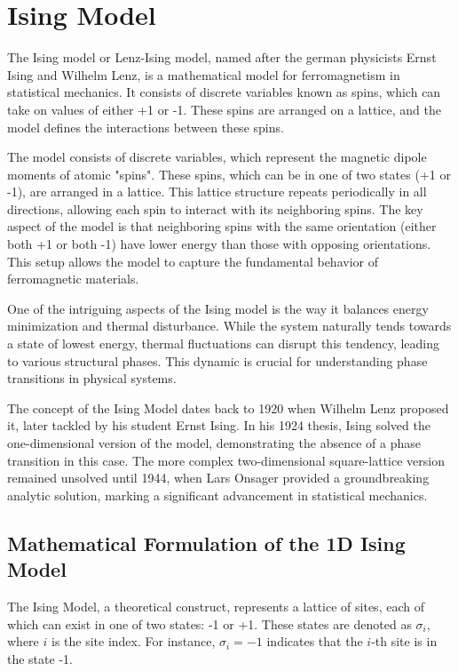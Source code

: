 \section{Ising Model}
\label{sec:ising}

The Ising model or  Lenz-Ising model, named after the german physicists Ernst
Ising and  Wilhelm Lenz, is a mathematical model for ferromagnetism in
statistical mechanics. It consists of discrete variables known as spins, which
can take on values of either +1 or -1. These spins are arranged on a lattice,
and the model defines the interactions between these spins.

The model consists of discrete variables, which represent the magnetic dipole
moments of atomic "spins". These spins, which can be in one of two states (+1 or
-1), are arranged in a lattice. This lattice structure repeats periodically in
all directions, allowing each spin to interact with its neighboring spins. The
key aspect of the model is that neighboring spins with the same orientation
(either both +1 or both -1) have lower energy than those with opposing
orientations. This setup allows the model to capture the fundamental behavior of
ferromagnetic materials.

One of the intriguing aspects of the Ising model is the way it balances energy
minimization and thermal disturbance. While the system naturally tends towards a
state of lowest energy, thermal fluctuations can disrupt this tendency, leading
to various structural phases. This dynamic is crucial for understanding phase
transitions in physical systems.

The concept of the Ising Model dates back to 1920 when Wilhelm Lenz proposed it,
later tackled by his student Ernst Ising. In his 1924 thesis, Ising solved the
one-dimensional version of the model, demonstrating the absence of a phase
transition in this case. The more complex two-dimensional square-lattice version
remained unsolved until 1944, when Lars Onsager provided a groundbreaking
analytic solution, marking a significant advancement in statistical mechanics.

\subsection{Mathematical Formulation of the 1D Ising Model}
The Ising Model, a theoretical construct, represents a lattice of sites, each of
which can exist in one of two states: -1 or +1. These states are denoted as
$\sigma_i$, where $i$ is the site index. For instance, $\sigma_i = -1$ indicates
that the $i$-th site is in the state -1.

